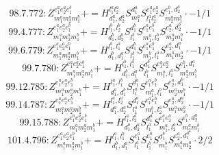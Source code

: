 \documentclass[letterpaper,10pt,fleqn,leqno,onecolumn]{article}
\begin{document}
\begin{equation} \;\;\;\;\;\;  98.7.772: Z^{e_{1}^{a}e_{2}^{a}e_{1}^{b}}_{m_{1}^{a}m_{2}^{a}m_{1}^{b}}+=H^{l_{1}^{a}l_{2}^{a}}_{d_{1}^{a},d_{2}^{a}}S^{d_{1}^{a}}_{m_{1}^{a}}S^{e_{1}^{a}e_{2}^{a}}_{l_{1}^{a}l_{2}^{a}}S^{e_{1}^{b},d_{2}^{a}}_{m_{2}^{a}m_{1}^{b}}\cdot -1/1 \end{equation}
\begin{equation} \;\;\;\;\;\;  99.4.777: Z^{e_{1}^{a}e_{2}^{a}e_{1}^{b}}_{m_{1}^{a}m_{2}^{a}m_{1}^{b}}+=H^{l_{1}^{b},l_{2}^{b}}_{d_{1}^{b},d_{2}^{b}}S^{d_{1}^{b}}_{l_{1}^{b}}S^{e_{1}^{a}e_{1}^{b}}_{m_{1}^{a},l_{2}^{b}}S^{e_{2}^{a},d_{2}^{b}}_{m_{2}^{a}m_{1}^{b}}\cdot -1/1 \end{equation}
\begin{equation} \;\;\;\;\;\;  99.6.779: Z^{e_{1}^{a}e_{2}^{a}e_{1}^{b}}_{m_{1}^{a}m_{2}^{a}m_{1}^{b}}+=H^{l_{1}^{b},l_{1}^{a}}_{d_{1}^{b},d_{1}^{a}}S^{d_{1}^{b}}_{l_{1}^{b}}S^{e_{1}^{a}e_{1}^{b}}_{m_{1}^{b},l_{1}^{a}}S^{e_{2}^{a},d_{1}^{a}}_{m_{1}^{a}m_{2}^{a}}\cdot -1/1 \end{equation}
\begin{equation} \;\;\;\;\;\;  99.7.780: Z^{e_{1}^{a}e_{2}^{a}e_{1}^{b}}_{m_{1}^{a}m_{2}^{a}m_{1}^{b}}+=H^{l_{1}^{b},l_{1}^{a}}_{d_{1}^{b},d_{1}^{a}}S^{d_{1}^{b}}_{l_{1}^{b}}S^{e_{1}^{a}e_{2}^{a}}_{m_{1}^{a},l_{1}^{a}}S^{e_{1}^{b},d_{1}^{a}}_{m_{2}^{a}m_{1}^{b}} \end{equation}
\begin{equation} \;\;\;\;\;\;  99.12.785: Z^{e_{1}^{a}e_{2}^{a}e_{1}^{b}}_{m_{1}^{a}m_{2}^{a}m_{1}^{b}}+=H^{l_{1}^{a},l_{1}^{b}}_{d_{1}^{a},d_{1}^{b}}S^{d_{1}^{a}}_{l_{1}^{a}}S^{e_{1}^{a}e_{1}^{b}}_{m_{1}^{a},l_{1}^{b}}S^{e_{2}^{a},d_{1}^{b}}_{m_{2}^{a}m_{1}^{b}}\cdot -1/1 \end{equation}
\begin{equation} \;\;\;\;\;\;  99.14.787: Z^{e_{1}^{a}e_{2}^{a}e_{1}^{b}}_{m_{1}^{a}m_{2}^{a}m_{1}^{b}}+=H^{l_{1}^{a},l_{2}^{a}}_{d_{1}^{a},d_{2}^{a}}S^{d_{1}^{a}}_{l_{1}^{a}}S^{e_{1}^{a}e_{1}^{b}}_{m_{1}^{b},l_{2}^{a}}S^{e_{2}^{a},d_{2}^{a}}_{m_{1}^{a}m_{2}^{a}}\cdot -1/1 \end{equation}
\begin{equation} \;\;\;\;\;\;  99.15.788: Z^{e_{1}^{a}e_{2}^{a}e_{1}^{b}}_{m_{1}^{a}m_{2}^{a}m_{1}^{b}}+=H^{l_{1}^{a},l_{2}^{a}}_{d_{1}^{a},d_{2}^{a}}S^{d_{1}^{a}}_{l_{1}^{a}}S^{e_{1}^{a}e_{2}^{a}}_{m_{1}^{a},l_{2}^{a}}S^{e_{1}^{b},d_{2}^{a}}_{m_{2}^{a}m_{1}^{b}} \end{equation}
\begin{equation} \;\;\;\;\;\;  101.4.796: Z^{e_{1}^{a}e_{2}^{a}e_{1}^{b}}_{m_{1}^{a}m_{2}^{a}m_{1}^{b}}+=H^{l_{1}^{a},l_{1}^{b}}_{d_{1}^{b},d_{1}^{a}}S^{e_{1}^{a}}_{l_{1}^{a}}S^{e_{1}^{b}}_{l_{1}^{b}}S^{d_{1}^{b}}_{m_{1}^{b}}S^{e_{2}^{a},d_{1}^{a}}_{m_{1}^{a}m_{2}^{a}}\cdot 2/2 \end{equation}
\end{document}
